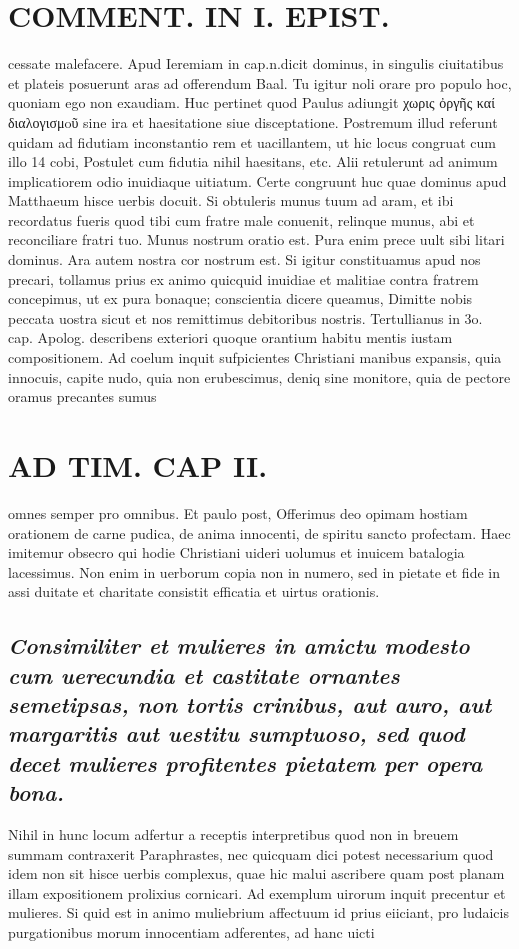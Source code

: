 \documentclass{article}
\begin{document}
\begin{pages}
\section*{COMMENT. IN I. EPIST. }\pstart cessate malefacere. Apud Ieremiam in cap.n.dicit dominus, in singulis ciuitatibus et plateis posuerunt aras ad offerendum Baal. Tu igitur noli orare pro populo hoc, quoniam ego non exaudiam. Huc pertinet quod Paulus adiungit χωρις ὀργῆς καί διαλογισμoῦ sine ira et haesitatione siue disceptatione. Postremum illud referunt quidam ad fidutiam inconstantio rem et uacillantem, ut hic locus congruat cum illo 14 cobi, Postulet cum fidutia nihil haesitans, etc. Alii retulerunt ad animum implicatiorem odio inuidiaque uitiatum. Certe congruunt huc quae dominus apud Matthaeum hisce uerbis docuit. Si obtuleris munus tuum ad aram, et ibi recordatus fueris quod tibi cum fratre male conuenit, relinque munus, abi et reconciliare fratri tuo. Munus nostrum oratio est. Pura enim prece uult sibi litari dominus. Ara autem nostra cor nostrum est. Si igitur constituamus apud nos precari, tollamus prius ex animo quicquid inuidiae et malitiae contra fratrem concepimus, ut ex pura bonaque; conscientia dicere queamus, Dimitte nobis peccata uostra sicut et nos remittimus debitoribus nostris. Tertullianus in 3o. cap. Apolog. describens exteriori quoque orantium habitu mentis iustam compositionem. Ad coelum inquit sufpicientes Christiani manibus expansis, quia innocuis, capite nudo, quia non erubescimus, deniq sine monitore, quia de pectore oramus precantes sumus  \pend
\section*{AD TIM. CAP II. }
\marginpar{[ p.119 ]}\pstart omnes semper pro omnibus. Et paulo post, Offerimus deo opimam hostiam orationem de carne pudica, de anima innocenti, de spiritu sancto profectam. Haec imitemur obsecro qui hodie Christiani uideri uolumus et inuicem batalogia lacessimus. Non enim in uerborum copia non in numero, sed in pietate et fide in assi duitate et charitate consistit efficatia et uirtus orationis.  \pend 
{}
{}
\subsection*{\textit{Consimiliter et mulieres in amictu modesto cum uerecundia et castitate ornantes semetipsas, non tortis crinibus, aut auro, aut margaritis aut uestitu sumptuoso, sed quod decet mulieres profitentes pietatem per opera bona. }}\pstart Nihil in hunc locum adfertur a receptis interpretibus quod non in breuem summam contraxerit Paraphrastes, nec quicquam dici potest necessarium quod idem non sit hisce uerbis complexus, quae hic malui ascribere quam post planam illam expositionem prolixius cornicari. Ad exemplum uirorum inquit precentur et mulieres. Si quid est in animo muliebrium affectuum id prius eiiciant, pro ludaicis purgationibus morum innocentiam adferentes, ad hanc uicti\pend

\end{pages}
\end{document}
